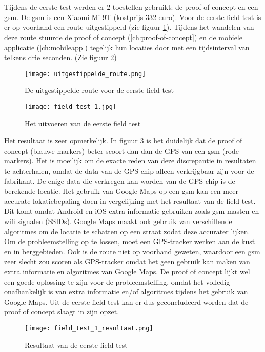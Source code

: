 \section{}
Tijdens de eerste test werden er 2 toestellen gebruikt: de proof of concept en een gsm. De gsm is een Xiaomi Mi 9T (kostprijs 332 euro).
Voor de eerste field test is er op voorhand een route uitgestippeld (zie figuur \ref{fig:uitgestippelde_route}). Tijdens het wandelen van deze route stuurde de proof of concept (\ref{ch:proof-of-concept}) en de mobiele applicatie (\ref{ch:mobileapp}) tegelijk hun locaties door met een tijdsinterval van telkens drie seconden. (Zie figuur \ref{fig:field_test_1})
\begin{figure}
	\texttt{[image: uitgestippelde\_route.png]}
	\caption{De uitgestippelde route voor de eerste field test}
	\label{fig:uitgestippelde_route}
\end{figure}
\begin{figure}
	\texttt{[image: field\_test\_1.jpg]}
	\caption{Het uitvoeren van de eerste field test}
	\label{fig:field_test_1}
\end{figure}
\newline
\newline
Het resultaat is zeer opmerkelijk. In figuur \ref{fig:field_test_1_resultaat} is het duidelijk dat de proof of concept (blauwe markers) beter scoort dan dan de GPS van een gsm (rode markers). Het is moeilijk om de exacte reden van deze discrepantie in resultaten te achterhalen, omdat de data van de GPS-chip alleen verkrijgbaar zijn voor de fabrikant. De enige data die verkregen kan worden van de GPS-chip is de berekende locatie. 
\newline
Het gebruik van Google Maps op een gsm kan een meer accurate lokatiebepaling doen in vergelijking met het resultaat van de field test. Dit komt omdat Android en iOS extra informatie gebruiken zoals gsm-masten en wifi signalen (SSIDs). Google Maps maakt ook gebruik van verschillende algoritmes om de locatie te schatten op een straat zodat deze accurater lijken.
\newline
Om de probleemstelling op te lossen, moet een GPS-tracker werken aan de kust en in berggebieden. Ook is de route niet op voorhand geweten, waardoor een gsm zeer slecht zou scoren als GPS-tracker omdat het geen gebruik kan maken van extra informatie en algoritmes van Google Maps. De proof of concept lijkt wel een goede oplossing te zijn voor de probleemstelling, omdat het volledig onafhankelijk is van extra informatie en/of algoritmes tijdens het gebruik van Google Maps. 
\newline
Uit de eerste field test kan er dus geconcludeerd worden dat de proof of concept slaagt in zijn opzet.
\begin{figure}
	\texttt{[image: field\_test\_1\_resultaat.png]}
	\caption{Resultaat van de eerste field test}
	\label{fig:field_test_1_resultaat}
\end{figure}